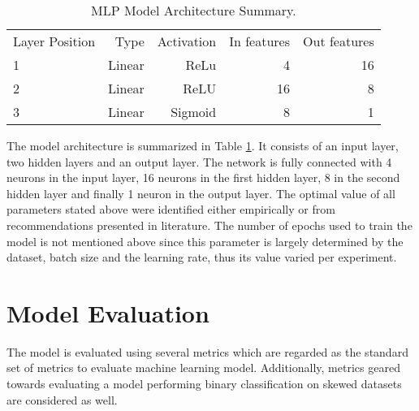 \begin{table}[htb]
  \centering
  \begin{tabular}{lrrrr}
    \hline
    Layer Position & Type & Activation & In features & Out features \\
    1 & Linear & ReLu & 4 & 16 \\
    2 & Linear & ReLU & 16 & 8 \\
    3 & Linear & Sigmoid & 8 & 1 \\
    \hline
  \end{tabular}
  \caption{MLP Model Architecture Summary.}
  \label{tab:mlp-model-arch}
\end{table}

The model architecture is summarized in Table
\ref{tab:mlp-model-arch}. It consists of an input layer, two hidden
layers and an output layer. The network is fully connected with 4
neurons in the input layer, 16 neurons in the first hidden layer, 8 in
the second hidden layer and finally 1 neuron in the output layer. The
optimal value of all parameters stated above were identified either
empirically or from recommendations presented in literature. The
number of epochs used to train the model is not mentioned above since
this parameter is largely determined by the dataset, batch size and
the learning rate, thus its value varied per experiment.

\section{Model Evaluation}
\label{sec:mlp-model-eval}

The model is evaluated using several metrics which are regarded as the
standard set of metrics to evaluate machine learning model.
Additionally, metrics geared towards evaluating a model performing
binary classification on skewed datasets are considered as well.

